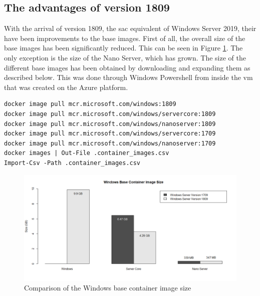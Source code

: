 \subsection{The advantages of version 1809}
With the arrival of version 1809, the \acrfull{sac} equivalent of Windows Server 2019, their have been improvements to the base images. First of all, the overall size of the base images has been significantly reduced. This can be seen in Figure \ref{fig:container_size}. The only exception is the size of the Nano Server, which has grown.
The size of the different base images has been obtained by downloading and expanding them as described below. This was done through Windows Powershell from inside the \acrshort{vm} that was created on the Azure platform. 

\begin{lstlisting}[breaklines]
docker image pull mcr.microsoft.com/windows:1809
docker image pull mcr.microsoft.com/windows/servercore:1809
docker image pull mcr.microsoft.com/windows/nanoserver:1809  
docker image pull mcr.microsoft.com/windows/servercore:1709 
docker image pull mcr.microsoft.com/windows/nanoserver:1709   
docker images | Out-File .container_images.csv
Import-Csv -Path .container_images.csv
\end{lstlisting}

\begin{figure}[h]
	\captionsetup{width=0.8\linewidth}
	\includegraphics[width=0.9\linewidth]{img/Container_size.png}
	\centering
	\caption{Comparison of the Windows base container image size}
	\label{fig:container_size}
\end{figure}

